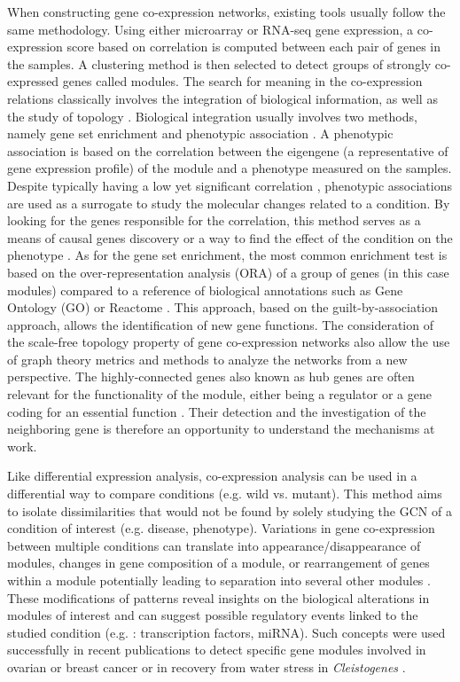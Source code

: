 When constructing gene co-expression networks, existing tools usually follow the same methodology. Using either microarray or RNA-seq gene expression, a co-expression score based on correlation is computed between each pair of genes in the samples. A clustering method is then selected to detect groups of strongly co-expressed genes called modules. The search for meaning in the co-expression relations classically involves the integration of biological information, as well as the study of topology . Biological integration usually involves two methods, namely gene set enrichment and phenotypic association . A phenotypic association is based on the correlation between the eigengene (a representative of gene expression profile) of the module and a phenotype measured on the samples. Despite typically having a low yet significant correlation , phenotypic associations are used as a surrogate to study the molecular changes related to a condition. By looking for the genes responsible for the correlation, this method serves as a means of causal genes discovery or a way to find the effect of the condition on the phenotype . As for the gene set enrichment, the most common enrichment test is based on the over-representation analysis (ORA) of a group of genes (in this case modules) compared to a reference of biological annotations such as Gene Ontology (GO)  or Reactome . This approach, based on the guilt-by-association approach, allows the identification of new gene functions. The consideration of the scale-free topology property of gene co-expression networks also allow the use of graph theory metrics and methods to analyze the networks from a new perspective.
The highly-connected genes also known as hub genes are often relevant for the functionality of the module, either being a regulator  or a gene coding for an essential function . Their detection and the investigation of the neighboring gene is therefore an opportunity to understand the mechanisms at work.

Like differential expression analysis, co-expression analysis can be used in a differential way to compare conditions (e.g. wild vs. mutant). This method aims to isolate dissimilarities  that would not be found by solely studying the GCN of a condition of interest (e.g. disease, phenotype). Variations in gene co-expression between multiple conditions can translate into appearance/disappearance of modules, changes in gene composition of a module, or rearrangement of genes within a module potentially leading to separation into several other modules . These modifications of patterns reveal insights on the biological alterations in modules of interest and can suggest possible regulatory events linked to the studied condition (e.g. : transcription factors, miRNA). Such concepts were used successfully in recent publications to  detect specific gene modules involved in ovarian or breast cancer  or in recovery from water stress in \textit{Cleistogenes} .

